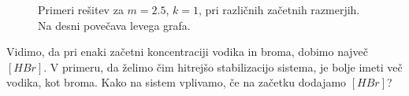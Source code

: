 \documentclass[slovene,11pt,a4paper]{article}
\numberwithin{equation}{section} %
\numberwithin{figure}{section} %
\numberwithin{table}{section} %
\begin{document}
\begin{figure}[h]
\noindent{}

\caption{Primeri rešitev za $m=2.5$, $k=1$, pri različnih začetnih razmerjih. Na desni povečava levega grafa.}
\end{figure}
Vidimo, da pri enaki začetni koncentraciji vodika in broma, dobimo največ $[HBr]$. V primeru, da želimo čim hitrejšo stabilizacijo sistema, je bolje imeti več vodika, kot broma. Kako na sistem vplivamo, če na začetku dodajamo $[HBr]$?
\end{document}
